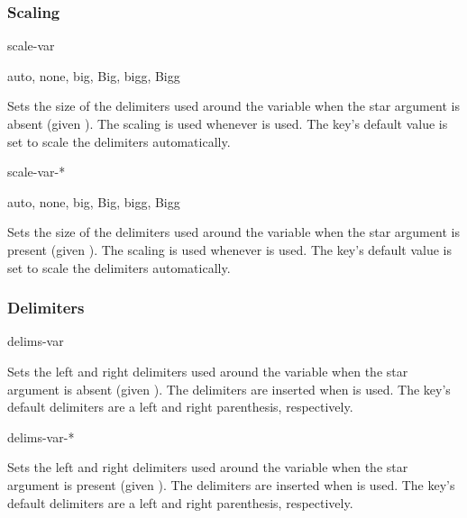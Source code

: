 	\subsubsection*{Scaling}
	
	\begin{option}{scale-var}
		\begin{values}[default = auto]
			auto, none, big, Big, bigg, Bigg
		\end{values}
		Sets the size of the delimiters used around the variable when the star argument is absent (given ). The scaling is used whenever  is used. The key's default value is set to scale the delimiters automatically.
	\end{option}
	
	\begin{option}{scale-var-*}
		\begin{values}[default = auto]
			auto, none, big, Big, bigg, Bigg
		\end{values}
		Sets the size of the delimiters used around the variable when the star argument is present (given ). The scaling is used whenever  is used. The key's default value is set to scale the delimiters automatically.
	\end{option}
	
	\subsubsection*{Delimiters}
	
	\begin{option}{delims-var}
		\begin{values}[default = (~)]
		\end{values}
		Sets the left and right delimiters used around the variable when the star argument is absent (given ). The delimiters are inserted when  is used. The key's default delimiters are a left and right parenthesis, respectively.
	\end{option}
	
	\begin{option}{delims-var-*}
		\begin{values}[default = (~)]
		\end{values}
		Sets the left and right delimiters used around the variable when the star argument is present (given ). The delimiters are inserted when  is used. The key's default delimiters are a left and right parenthesis, respectively.
	\end{option}
	
